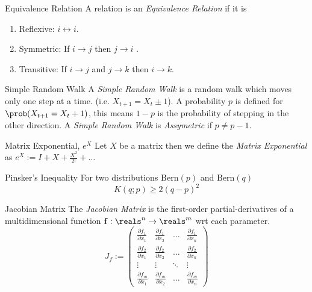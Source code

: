 \documentclass[11pt,a4paper]{article}
\begin{document}
\begin{definition}{Equivalence Relation}
  A relation is an \textit{Equivalence Relation} if it is
  \begin{enumerate}
    \item Reflexive: $i\leftrightarrow i$.
    \item Symmetric: If $i\to j$ then $j\to i$ .
    \item Transitive: If $i\to j$ and $j\to k$ then $i\to k$.
  \end{enumerate}
\end{definition}

\begin{definition}{Simple Random Walk}
  A \textit{Simple Random Walk} is a random walk which moves only one step at a time. (i.e. $X_{t+1}=X_t\pm1$). A probability $p$ is defined for $\prob(X_{t+1}=X_t+1)$, this means $1-p$ is the probability of stepping in the other direction. A \textit{Simple Random Walk} is \textit{Assymetric} if $p\neq p-1$.
\end{definition}

\begin{definition}{Matrix Exponential, $e^X$}
  Let $X$ be a matrix then we define the \textit{Matrix Exponential} as $e^X:=I+X+\frac{X^2}{2!}+\dots$
\end{definition}

\begin{theorem}{Pinsker's Inequality}
  For two distributions $\text{Bern}(p)$ and $\text{Bern}(q)$
  \[ K(q;p)\geq2(q-p)^2 \]
\end{theorem}

\begin{definition}{Jacobian Matrix}
  The \textit{Jacobian Matrix} is the first-order partial-derivatives of a multidimensional function $\mathbf{f}:\reals^n\to\reals^m$ wrt each parameter.
  \[ J_f:=\begin{pmatrix}
    \frac{\partial f_1}{\partial x_1}&\frac{\partial f_1}{\partial x_2}&\dots&\frac{\partial f_1}{\partial x_n}\\
    \frac{\partial f_2}{\partial x_1}&\frac{\partial f_2}{\partial x_2}&\dots&\frac{\partial f_2}{\partial x_n}\\
    \vdots&\vdots&\ddots&\vdots\\
    \frac{\partial f_m}{\partial x_1}&\frac{\partial f_m}{\partial x_2}&\dots&\frac{\partial f_m}{\partial x_n}
  \end{pmatrix}\]
\end{definition}
\end{document}
